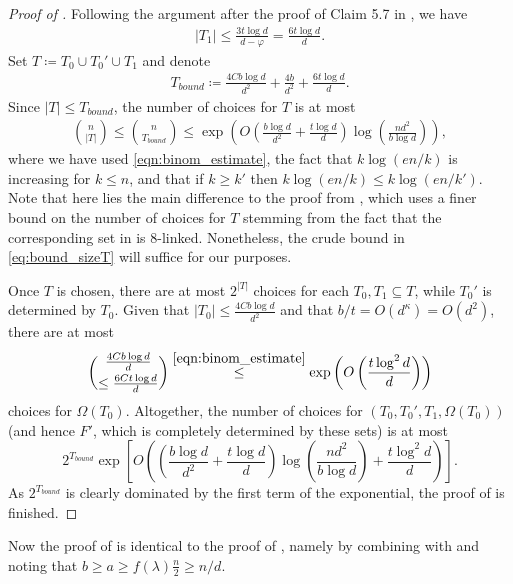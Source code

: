 \documentclass[reqno,a4paper,11pt]{amsart}
\newcommand{\lam}{\lambda}
\newcommand{\ex}{\kappa}
\begin{document}
\begin{proof}[Proof of ]
    Following the argument after the proof of Claim 5.7 in \cite{galvin2019independent}, we have 
    \begin{align*}
        |T_1| \leq \frac{3t \log d}{d-\varphi} = \frac{6t \log d}{d}.    
    \end{align*}
   Set $T \coloneqq T_0 \cup T_0' \cup T_1$  and denote
    \begin{align*}
        T_{bound} \coloneqq \frac{4C b \log d}{d^2} + \frac{4b}{d^2} + \frac{6t \log d}{d}.
    \end{align*}
    Since $|T| \leq T_{bound}$, the number of choices for $T$ is at most
    \begin{align} \label{eq:bound_sizeT}
        \binom{n}{|T|} \leq\binom{n}{T_{bound}} \leq \exp\left(O\left(\frac{b\log d}{d^2} + \frac{t \log d}{d} \right)\log\left(\frac{nd^2}{b \log d}\right)\right),
    \end{align}
    where we have used \eqref{eqn:binom_estimate}, the fact that $k\log(en/k)$ is increasing for $k\leq n$, and that if $k\geq k'$ then $k\log(en/k)\leq k\log(en/k')$. Note that here lies the main difference to the proof from \cite{galvin2019independent}, which uses a finer bound on the number of choices for $T$ stemming from the fact that the corresponding set in \cite{galvin2019independent} is $8$-linked. Nonetheless, the crude bound in \eqref{eq:bound_sizeT} will suffice for our purposes.

    Once $T$ is chosen, there are at most $2^{|T|}$ choices for each $T_0, T_1 \subseteq T$, while $T_0'$ is determined by $T_0$. Given that $|T_0|\leq \frac{4C b \log d}{d^2}$ and that $b/t=O(d^{\ex})=O(d^2)$, there are at most 
    $$\binom{\frac{4C b \log d}{d}}{\leq \frac{6Ct \log d}{d}}\overset{\eqref{eqn:binom_estimate}}{\leq} \exp\left(O\left(\frac{t\log^2 d}{d}\right)\right)$$
    choices for $\Omega(T_0)$. Altogether, the number of choices for $(T_0, T_0', T_1, \Omega(T_0))$ (and hence $F'$, which is completely determined by these sets) is at most
    $$2^{T_{bound}}\exp\left[O\left(\left(\frac{b\log d}{d^2} + \frac{t \log d}{d} \right)\log\left(\frac{nd^2}{b \log d}\right)+\frac{t\log^2 d}{d}\right)\right].$$
    As $2^{T_{bound}}$ is clearly dominated by the first term of the exponential, the proof of  is finished.
\end{proof}
Now the proof of  is identical to the proof of \cite[Lemma 4.2]{GeKaSaWdo25}, namely by combining \cite[Lemma 4.5]{GeKaSaWdo25} with  and noting that $b\geq a\geq f(\lam)\frac{n}{2} \geq n/d$.
\end{document}
